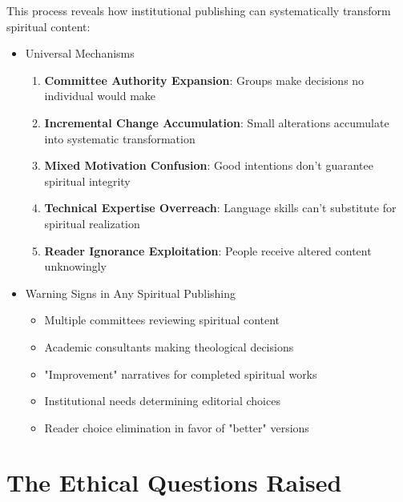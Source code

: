 \documentclass[11pt,twoside]{book}
\begin{document}
This process reveals how institutional publishing can systematically transform spiritual content:
\begin{itemize}
\item Universal Mechanisms
\label{sec:org1af530f}
\begin{enumerate}
\item \textbf{\textbf{Committee Authority Expansion}}: Groups make decisions no individual would make
\item \textbf{\textbf{Incremental Change Accumulation}}: Small alterations accumulate into systematic transformation
\item \textbf{\textbf{Mixed Motivation Confusion}}: Good intentions don't guarantee spiritual integrity
\item \textbf{\textbf{Technical Expertise Overreach}}: Language skills can't substitute for spiritual realization
\item \textbf{\textbf{Reader Ignorance Exploitation}}: People receive altered content unknowingly
\end{enumerate}
\item Warning Signs in Any Spiritual Publishing
\label{sec:orgc90e8db}
\begin{itemize}
\item Multiple committees reviewing spiritual content
\item Academic consultants making theological decisions
\item "Improvement" narratives for completed spiritual works
\item Institutional needs determining editorial choices
\item Reader choice elimination in favor of "better" versions
\end{itemize}
\end{itemize}
\section*{The Ethical Questions Raised}
\label{sec:orge1e01d7}
\end{document}

